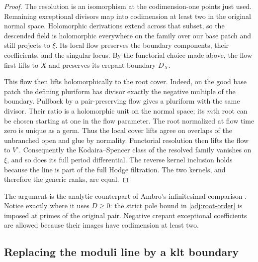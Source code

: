 \begin{proof}
The resolution is an isomorphism at the codimension-one points just
used.  Remaining exceptional divisors map into codimension at least
two in the original normal space.  Holomorphic derivations extend
across that subset, so the descended field is holomorphic everywhere
on the family over our base patch and still projects to $\xi$.
Its local flow preserves the boundary components, their coefficients,
and the singular locus.  By the functorial choice made above, the flow
first lifts to $X$ and preserves its crepant boundary $D_X$.

This flow then lifts holomorphically to the root cover.  Indeed, on the good
base patch the defining pluriform has divisor exactly the negative
multiple of the boundary.  Pullback by a pair-preserving flow gives a
pluriform with the same divisor.  Their ratio is a holomorphic unit on
the normal space; its $m$th root can be chosen starting at one in the
flow parameter.  The root normalized at flow time zero is unique as a germ.  Thus the
local cover lifts agree on overlaps of the unbranched open and glue
by normality.  Functorial
resolution then lifts the flow to $V^\circ$.
Consequently the Kodaira--Spencer class of the resolved family vanishes
on $\xi$, and so does its full period differential.
The reverse kernel inclusion holds because the line is part of the
full Hodge filtration.  The two kernels, and therefore the generic
ranks, are equal.
\end{proof}

The argument is the analytic counterpart of Ambro's infinitesimal
comparison \cite[Proposition~2.1]{Ambro}.  Notice exactly where it uses
$D\geq0$: the strict pole bound in \eqref{adj:root-order} is imposed at
primes of the original pair.  Negative crepant exceptional coefficients
are allowed because their images have codimension at least two.

\subsection{Replacing the moduli line by a klt boundary}

